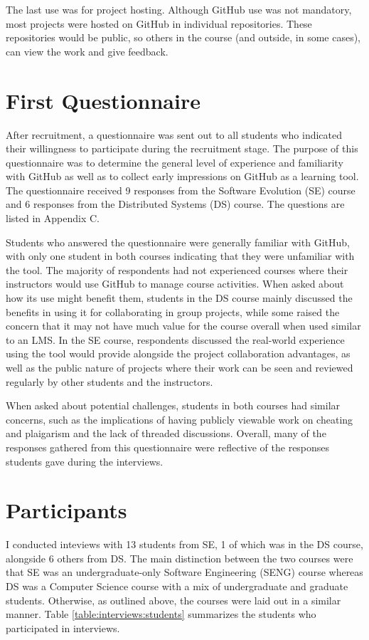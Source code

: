 The last use was for project hosting. Although GitHub use was not mandatory, most projects were hosted on GitHub in individual repositories. These repositories would be public, so others in the course (and outside, in some cases), can view the work and give feedback. %

\section{First Questionnaire}
After recruitment, a questionnaire was sent out to all students who indicated their willingness to participate during the recruitment stage. The purpose of this questionnaire was to determine the general level of experience and familiarity with GitHub as well as to collect early impressions on GitHub as a learning tool. The questionnaire received 9 responses from the Software Evolution (SE) course and 6 responses from the Distributed Systems (DS) course. The questions are listed in Appendix C.

Students who answered the questionnaire were generally familiar with GitHub, with only one student in both courses indicating that they were unfamiliar with the tool. The majority of respondents had not experienced courses where their instructors would use GitHub to manage course activities. When asked about how its use might benefit them, students in the DS course mainly discussed the benefits in using it for collaborating in group projects, while some raised the concern that it may not have much value for the course overall when used similar to an LMS. In the SE course, respondents discussed the real-world experience using the tool would provide alongside the project collaboration advantages, as well as the public nature of projects where their work can be seen and reviewed regularly by other students and the instructors.

When asked about potential challenges, students in both courses had similar concerns, such as the implications of having publicly viewable work on cheating and plaigarism and the lack of threaded discussions. Overall, many of the responses gathered from this questionnaire were reflective of the responses students gave during the interviews.

\section{Participants}
I conducted inteviews with 13 students from SE, 1 of which was in the DS course, alongside 6 others from DS. The main distinction between the two courses were that SE was an undergraduate-only Software Engineering (SENG) course whereas DS was a Computer Science course with a mix of undergraduate and graduate students. Otherwise, as outlined above, the courses were laid out in a similar manner. Table \ref{table:interviews:students} summarizes the students who participated in interviews.

